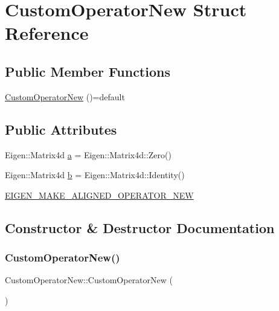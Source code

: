\hypertarget{struct_custom_operator_new}{}\section{Custom\+Operator\+New Struct Reference}
\label{struct_custom_operator_new}
\subsection*{Public Member Functions}
\begin{DoxyCompactItemize}
\item 
\mbox{\hyperlink{struct_custom_operator_new_a928b7f7a161822ede00b03745adb65ac}{Custom\+Operator\+New}} ()=default
\end{DoxyCompactItemize}
\subsection*{Public Attributes}
\begin{DoxyCompactItemize}
\item 
Eigen\+::\+Matrix4d \mbox{\hyperlink{struct_custom_operator_new_ad0f5f8aaedbb84dc5d904389a05f5740}{a}} = Eigen\+::\+Matrix4d\+::\+Zero()
\item 
Eigen\+::\+Matrix4d \mbox{\hyperlink{struct_custom_operator_new_adae79d9b641ba4b7f4221e6bdd7dcc49}{b}} = Eigen\+::\+Matrix4d\+::\+Identity()
\item 
\mbox{\hyperlink{struct_custom_operator_new_a5c9fd4a1fa6f897105929bdd74c91368}{E\+I\+G\+E\+N\+\_\+\+M\+A\+K\+E\+\_\+\+A\+L\+I\+G\+N\+E\+D\+\_\+\+O\+P\+E\+R\+A\+T\+O\+R\+\_\+\+N\+EW}}
\end{DoxyCompactItemize}


\subsection{Constructor \& Destructor Documentation}
\mbox{\label{struct_custom_operator_new_a928b7f7a161822ede00b03745adb65ac}} 
\subsubsection{\texorpdfstring{CustomOperatorNew()}{CustomOperatorNew()}}
{\footnotesize\ttfamily Custom\+Operator\+New\+::\+Custom\+Operator\+New (\begin{DoxyParamCaption}{ }\end{DoxyParamCaption})\hspace{0.3cm}{\ttfamily [default]}}



